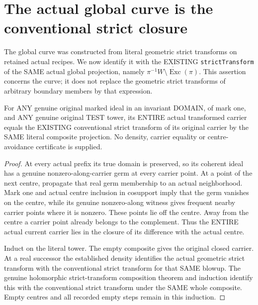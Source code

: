 \section{The actual global curve is the conventional strict closure}

The global curve was constructed from literal geometric strict transforms
on retained actual recipes. We now identify it with the EXISTING
\texttt{strictTransform} of the SAME actual global projection, namely
$\overline{\pi^{-1}W\setminus\operatorname{Exc}(\pi)}$.
This assertion concerns the curve; it does not replace the geometric
strict transforms of arbitrary boundary members by that expression.

\begin{theorem}
\label{hir:sharp-actual-test-carrier-conventional-strict}
\leanok
For ANY genuine original marked ideal in an invariant DOMAIN, of mark
one, and ANY genuine original TEST tower, its ENTIRE actual transformed
carrier equals the EXISTING conventional strict transform of its
original carrier by the SAME literal composite projection. No density,
carrier equality or centre-avoidance certificate is supplied.
\end{theorem}
\begin{proof}
At every actual prefix its true domain is preserved, so its coherent
ideal has a genuine nonzero-along-carrier germ at every carrier point.
At a point of the next centre, propagate that real germ membership to
an actual neighborhood. Mark one and actual centre inclusion in
cosupport imply that the germ vanishes on the centre, while its genuine
nonzero-along witness gives frequent nearby carrier points where it is
nonzero. These points lie off the centre. Away from the centre a carrier
point already belongs to the complement. Thus the ENTIRE actual current
carrier lies in the closure of its difference with the actual centre.

Induct on the literal tower. The empty composite gives the original
closed carrier. At a real successor the established density identifies
the actual geometric strict transform with the conventional strict
transform for that SAME blowup. The genuine holomorphic strict-transform
composition theorem and induction identify this with the conventional
strict transform under the SAME whole composite. Empty centres and all
recorded empty steps remain in this induction.
\end{proof}


